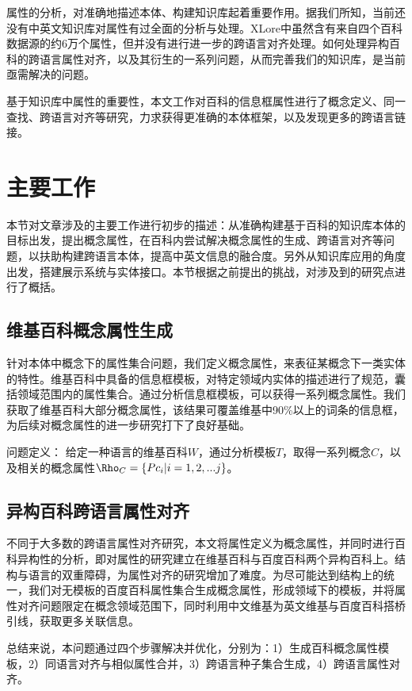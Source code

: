 属性的分析，对准确地描述本体、构建知识库起着重要作用。据我们所知，当前还没有中英文知识库对属性有过全面的分析与处理。XLore中虽然含有来自四个百科数据源的约6万个属性，但并没有进行进一步的跨语言对齐处理。如何处理异构百科的跨语言属性对齐，以及其衍生的一系列问题，从而完善我们的知识库，是当前亟需解决的问题。

基于知识库中属性的重要性，本文工作对百科的信息框属性进行了概念定义、同一查找、跨语言对齐等研究，力求获得更准确的本体框架，以及发现更多的跨语言链接。

\section{主要工作}
本节对文章涉及的主要工作进行初步的描述：从准确构建基于百科的知识库本体的目标出发，提出概念属性，在百科内尝试解决概念属性的生成、跨语言对齐等问题，以扶助构建跨语言本体，提高中英文信息的融合度。另外从知识库应用的角度出发，搭建展示系统与实体接口。本节根据之前提出的挑战，对涉及到的研究点进行了概括。

\subsection{维基百科概念属性生成}
针对本体中概念下的属性集合问题，我们定义概念属性，来表征某概念下一类实体的特性。维基百科中具备的信息框模板，对特定领域内实体的描述进行了规范，囊括领域范围内的属性集合。通过分析信息框模板，可以获得一系列概念属性。我们获取了维基百科大部分概念属性，该结果可覆盖维基中90\%以上的词条的信息框，为后续对概念属性的进一步研究打下了良好基础。

{\heiti 问题定义：} 给定一种语言的维基百科$W$，通过分析模板$T$，取得一系列概念$C$，以及相关的概念属性$\Rho_C=\{P{c_i}|i=1,2,...j\}$。

\subsection{异构百科跨语言属性对齐}
不同于大多数的跨语言属性对齐研究，本文将属性定义为概念属性，并同时进行百科异构性的分析，即对属性的研究建立在维基百科与百度百科两个异构百科上。结构与语言的双重障碍，为属性对齐的研究增加了难度。为尽可能达到结构上的统一，我们对无模板的百度百科属性集合生成概念属性，形成领域下的模板，并将属性对齐问题限定在概念领域范围下，同时利用中文维基为英文维基与百度百科搭桥引线，获取更多关联信息。

总结来说，本问题通过四个步骤解决并优化，分别为：1）生成百科概念属性模板，2）同语言对齐与相似属性合并，3）跨语言种子集合生成，4）跨语言属性对齐。

